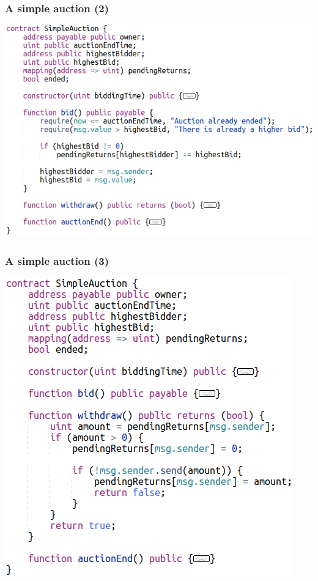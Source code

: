 \documentclass[11pt]{beamer}  %
\begin{document}
\begin{frame}\frametitle{A simple auction (2)}

  \begin{center}
    \includegraphics[scale=0.48,clip=false]{pictures/simple-auction-2.png}
  \end{center}

\end{frame}

\begin{frame}\frametitle{A simple auction (3)}

  \begin{center}
    \includegraphics[scale=0.45,clip=false]{pictures/simple-auction-3.png}
  \end{center}

\end{frame}
\end{document}
